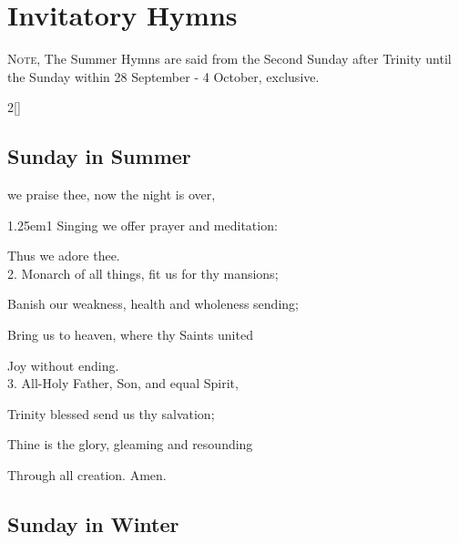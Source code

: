 \fancyhead[RO,LE]{}
\fancyhead[RE,LO]{}
\label{DailyHymns}

\section{Invitatory Hymns}
\begin{secrubric}
	\textsc{Note,} The Summer Hymns are said from the Second Sunday after Trinity until the Sunday within 28 September - 4 October, exclusive.
\end{secrubric}


\begin{paracol}{2}[]
\sloppy

\subsection{Sunday in Summer}\label{SundayInvitatory}

 we praise thee, now the night is over,


\begin{hangparas}{1.25em}{1}
Singing we offer prayer and meditation:

Thus we adore thee.\\

2. Monarch of all things, fit us for thy mansions;

Banish our weakness, health and wholeness sending;

Bring us to heaven, where thy Saints united

Joy without ending.\\

3. All-Holy Father, Son, and equal Spirit,

Trinity blessed send us thy salvation;

Thine is the glory, gleaming and resounding

Through all creation. Amen.
\end{hangparas}

\switchcolumn

\subsection{Sunday in Winter}\label{SundayInvitatoryWinter}


\end{paracol}
